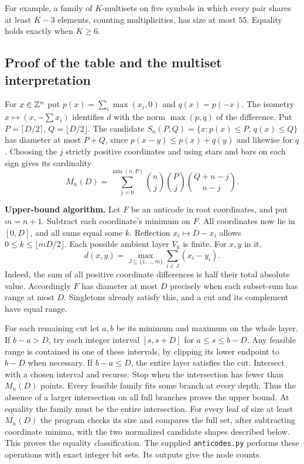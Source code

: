 For example, a family of $K$-multisets on five symbols in which every pair
shares at least $K-3$ elements, counting multiplicities, has size at most
$55$. Equality holds exactly when $K\ge6$.


\subsection{Proof of the table and the multiset interpretation}
For $x\in\mathbb Z^n$ put $p(x)=\sum_i\max(x_i,0)$ and $q(x)=p(-x)$.
The isometry $x\mapsto(x,-\sum x_i)$ identifies $d$ with the norm
$\max(p,q)$ of the difference. Put $P=\lceil D/2\rceil$,
$Q=\lfloor D/2\rfloor$. The candidate $S_n(P,Q)=\{x:p(x)\le P,\,q(x)\le Q\}$
has diameter at most $P+Q$, since $p(x-y)\le p(x)+q(y)$ and likewise
for $q$. Choosing the $j$ strictly positive coordinates and using
stars and bars on each sign gives its cardinality
\[
 M_n(D)=\sum_{j=0}^{\min(n,P)}
 {n\choose j}{P\choose j}{Q+n-j\choose n-j}.
\]

\textbf{Upper-bound algorithm.}
Let $F$ be an anticode in root coordinates, and put $m=n+1$.
Subtract each coordinate's minimum on $F$. All coordinates now lie
in $[0,D]$, and all sums equal some $k$. Reflection $x_i\mapsto D-x_i$
allows $0\le k\le\lfloor mD/2\rfloor$. Each possible ambient layer
$V_k$ is finite. For $x,y$ in it,
\[
 d(x,y)=\max_{J\subseteq\{1,\ldots,m\}}
 \sum_{i\in J}(x_i-y_i).
\]
Indeed, the sum of all positive coordinate differences is half their total
absolute value. Accordingly $F$ has diameter at most $D$ precisely when
each subset-sum has range at most $D$. Singletons already satisfy this,
and a cut and its complement have equal range.

For each remaining cut let $a,b$ be its minimum and maximum on the whole
layer. If $b-a>D$, try each integer interval $[s,s+D]$ for
$a\le s\le b-D$. Any feasible range is contained in one of these
intervals, by clipping its lower endpoint to $b-D$ when necessary.
If $b-a\le D$, the entire layer satisfies the cut. Intersect with a
chosen interval and recurse. Stop when the intersection has fewer than
$M_n(D)$ points. Every feasible family fits some branch at every depth.
Thus the absence of a larger intersection on all full branches proves the
upper bound. At equality the family must be the entire intersection.
For every leaf of size at least $M_n(D)$ the program checks its size
and compares the full set, after subtracting coordinate minima, with the
two normalized candidate shapes described below. This proves the equality
classification. The supplied \texttt{anticodes.py} performs these
operations with exact integer bit sets. Its outputs give the node counts.

